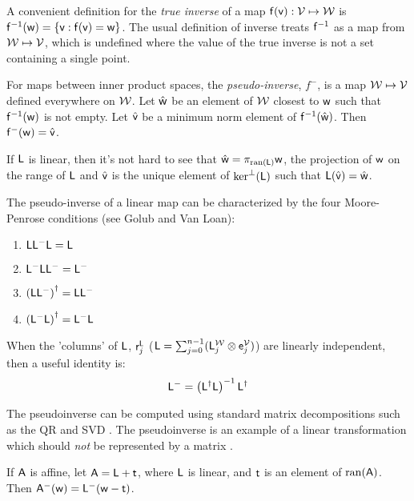 A convenient definition for the {\it true inverse}
of a map $\mathsf{f}(\mathsf{v}):\mathcal{V} \mapsto \mathcal{W}$ is
$\mathsf{f}^{-1}(\mathsf{w}) = \{ \mathsf{v} : \mathsf{f}(\mathsf{v}) = \mathsf{w} \}$.
The usual definition of inverse treats $\mathsf{f}^{-1}$
as a map from $\mathcal{W} \mapsto \mathcal{V}$,
which is undefined where the value of the true
inverse is not a set containing a single point.

For maps between inner product spaces,
the {\it pseudo-inverse}, $f^{-}$, is a map $\mathcal{W} \mapsto \mathcal{V}$
defined everywhere on $\mathcal{W}$.
Let $\hat{\mathsf{w}}$ be an element of $\mathcal{W}$ closest to $\mathsf{w}$
such that $\mathsf{f}^{-1}(\mathsf{w})$ is not empty.
Let $\hat{\mathsf{v}}$ be a minimum norm element of $\mathsf{f}^{-1}(\hat{\mathsf{w}})$.
Then $\mathsf{f}^{-}(\mathsf{w}) = \hat{\mathsf{v}}$.

If $\mathsf{L}$ is linear, then it's not hard to see that
$\hat{\mathsf{w}} = \pi_{\mathrm{ran}(\mathsf{L})} \mathsf{w}$, the projection of $\mathsf{w}$
on the range of $\mathsf{L}$
and
$\hat{\mathsf{v}}$ is the unique element of $\mathrm{ker}^{\perp}(\mathsf{L})$
such that $\mathsf{L}(\hat{\mathsf{v}}) = \hat{\mathsf{w}}$.

The pseudo-inverse of a linear map can be characterized
by the four Moore-Penrose conditions
(see Golub and Van Loan\cite[sec.~5.5.4]{golub-vanloan-1996}):
\begin{enumerate}
\item $\mathsf{L} \mathsf{L}^{-} \mathsf{L} = \mathsf{L}$
\item $\mathsf{L}^{-} \mathsf{L} \mathsf{L}^{-} = \mathsf{L}^{-}$
\item $\left( \mathsf{L} \mathsf{L}^{-} \right)^{\dagger} = \mathsf{L} \mathsf{L}^{-}$
\item $\left( \mathsf{L}^{-} \mathsf{L} \right)^{\dagger} = \mathsf{L}^{-} \mathsf{L}$
\end{enumerate}

When the 'columns' of $\mathsf{L}$, $\mathsf{r}_j^{\mathsf{L}}$
($\mathsf{L} = \sum_{j=0}^{n-1} ( \mathsf{L}_j^{\mathcal{W}} \otimes \mathsf{e}_j^{\mathcal{V}} )$)
are linearly independent,
then a useful identity is:
\begin{equation}
\label{eq:full-rank-pseudo-inverse}
\mathsf{L}^{-} = \left( \mathsf{L}^{\dagger} \mathsf{L} \right)^{-1} \mathsf{L}^{\dagger}
\end{equation}

The pseudoinverse can be computed
using standard matrix decompositions such as
the QR and SVD \cite{golub-vanloan-1996}.
The pseudoinverse is an example of a linear transformation
which should {\em not} be represented by a matrix
\cite{mcdonald-1989b}.

If $\mathsf{A}$ is affine,
let $\mathsf{A} = \mathsf{L} + \mathsf{t}$,
where $\mathsf{L}$ is linear,
and $\mathsf{t}$ is an element of $\mathrm{ran}(\mathsf{A})$.
Then $\mathsf{A}^{-}(\mathsf{w}) = \mathsf{L}^{-}( \mathsf{w} - \mathsf{t} )$.



